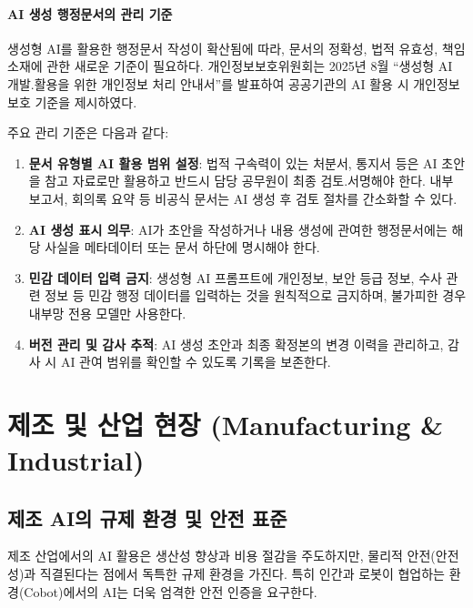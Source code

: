 \paragraph{AI 생성 행정문서의 관리 기준}

생성형 AI를 활용한 행정문서 작성이 확산됨에 따라,
문서의 정확성, 법적 유효성, 책임 소재에 관한 새로운 기준이 필요하다.
개인정보보호위원회는 2025년 8월 ``생성형 AI 개발.활용을 위한
개인정보 처리 안내서''를 발표하여 공공기관의 AI 활용 시
개인정보 보호 기준을 제시하였다\cite{pipc_genai_2025}.

주요 관리 기준은 다음과 같다:

\begin{enumerate}
 \item \textbf{문서 유형별 AI 활용 범위 설정}:
 법적 구속력이 있는 처분서, 통지서 등은 AI 초안을 참고 자료로만 활용하고
 반드시 담당 공무원이 최종 검토.서명해야 한다.
 내부 보고서, 회의록 요약 등 비공식 문서는 AI 생성 후 검토 절차를
 간소화할 수 있다.

 \item \textbf{AI 생성 표시 의무}:
 AI가 초안을 작성하거나 내용 생성에 관여한 행정문서에는
 해당 사실을 메타데이터 또는 문서 하단에 명시해야 한다.

 \item \textbf{민감 데이터 입력 금지}:
 생성형 AI 프롬프트에 개인정보, 보안 등급 정보, 수사 관련 정보 등
 민감 행정 데이터를 입력하는 것을 원칙적으로 금지하며,
 불가피한 경우 내부망 전용 모델만 사용한다.

 \item \textbf{버전 관리 및 감사 추적}:
 AI 생성 초안과 최종 확정본의 변경 이력을 관리하고,
 감사 시 AI 관여 범위를 확인할 수 있도록 기록을 보존한다.
\end{enumerate}


\section{제조 및 산업 현장 (Manufacturing \& Industrial)}
\label{sec:5.4}

\subsection{제조 AI의 규제 환경 및 안전 표준}
\label{sec:5.4.1}

제조 산업에서의 AI 활용은 생산성 향상과 비용 절감을 주도하지만, 물리적 안전(안전성)과 직결된다는 점에서 독특한 규제 환경을 가진다. 특히 인간과 로봇이 협업하는 환경(Cobot)에서의 AI는 더욱 엄격한 안전 인증을 요구한다.

